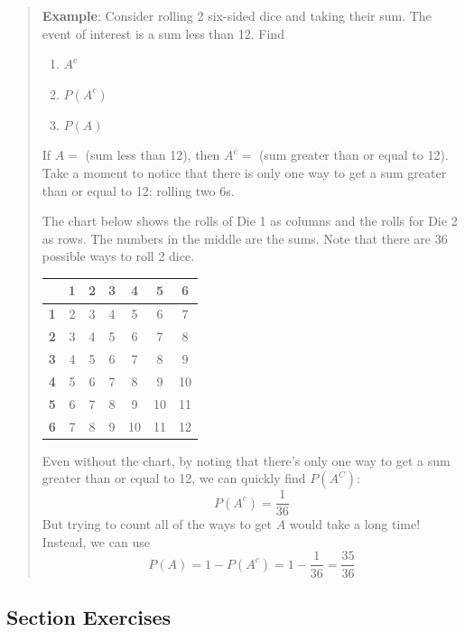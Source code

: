 \documentclass[
]{book}
\providecommand{\tightlist}{%
  \setlength{\itemsep}{0pt}\setlength{\parskip}{0pt}}
\begin{document}
\begin{quote}
\textbf{Example}: Consider rolling 2 six-sided dice and taking their sum. The event of interest is a sum less than 12. Find

\begin{enumerate}
\def\labelenumi{\arabic{enumi}.}
\tightlist
\item
  \(A^c\)
\item
  \(P(A^c)\)
\item
  \(P(A)\)
\end{enumerate}

If \(A =\) (sum less than 12), then \(A^c =\) (sum greater than or equal to 12). Take a moment to notice that there is only one way to get a sum greater than or equal to 12: rolling two 6s.

The chart below shows the rolls of Die 1 as columns and the rolls for Die 2 as rows. The numbers in the middle are the sums. Note that there are 36 possible ways to roll 2 dice.

\begin{longtable}[]{@{}lcccccc@{}}
\toprule\noalign{}
& 1 & 2 & 3 & 4 & 5 & 6 \\
\midrule\noalign{}
\endhead
\bottomrule\noalign{}
\endlastfoot
\textbf{1} & 2 & 3 & 4 & 5 & 6 & 7 \\
\textbf{2} & 3 & 4 & 5 & 6 & 7 & 8 \\
\textbf{3} & 4 & 5 & 6 & 7 & 8 & 9 \\
\textbf{4} & 5 & 6 & 7 & 8 & 9 & 10 \\
\textbf{5} & 6 & 7 & 8 & 9 & 10 & 11 \\
\textbf{6} & 7 & 8 & 9 & 10 & 11 & 12 \\
\end{longtable}

Even without the chart, by noting that there's only one way to get a sum greater than or equal to 12, we can quickly find \(P(A^C)\): \[ P(A^c) = \frac{1}{36}\]
But trying to count all of the ways to get \(A\) would take a long time! Instead, we can use \[P(A) = 1 - P(A^c) = 1-\frac{1}{36} = \frac{35}{36}\]
\end{quote}

\subsection*{Section Exercises}\label{section-exercises-11}
\end{document}
